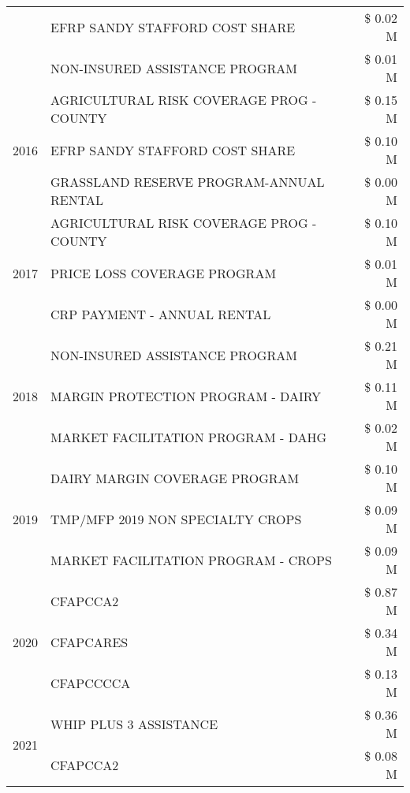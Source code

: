 \begin{tabular}{llr}
 & EFRP SANDY STAFFORD COST SHARE & \$ 0.02 M \\
 & NON-INSURED ASSISTANCE PROGRAM & \$ 0.01 M \\
\cline{1-3}
\multirow[t]{3}{*}{2016} & AGRICULTURAL RISK COVERAGE PROG - COUNTY & \$ 0.15 M \\
 & EFRP SANDY STAFFORD COST SHARE & \$ 0.10 M \\
 & GRASSLAND RESERVE PROGRAM-ANNUAL RENTAL & \$ 0.00 M \\
\cline{1-3}
\multirow[t]{3}{*}{2017} & AGRICULTURAL RISK COVERAGE PROG - COUNTY & \$ 0.10 M \\
 & PRICE LOSS COVERAGE PROGRAM & \$ 0.01 M \\
 & CRP PAYMENT - ANNUAL RENTAL & \$ 0.00 M \\
\cline{1-3}
\multirow[t]{3}{*}{2018} & NON-INSURED ASSISTANCE PROGRAM & \$ 0.21 M \\
 & MARGIN PROTECTION PROGRAM - DAIRY & \$ 0.11 M \\
 & MARKET FACILITATION PROGRAM - DAHG & \$ 0.02 M \\
\cline{1-3}
\multirow[t]{3}{*}{2019} & DAIRY MARGIN COVERAGE PROGRAM & \$ 0.10 M \\
 & TMP/MFP 2019 NON SPECIALTY CROPS & \$ 0.09 M \\
 & MARKET FACILITATION PROGRAM - CROPS & \$ 0.09 M \\
\cline{1-3}
\multirow[t]{3}{*}{2020} & CFAPCCA2 & \$ 0.87 M \\
 & CFAPCARES & \$ 0.34 M \\
 & CFAPCCCCA & \$ 0.13 M \\
\cline{1-3}
\multirow[t]{2}{*}{2021} & WHIP PLUS 3 ASSISTANCE & \$ 0.36 M \\
 & CFAPCCA2 & \$ 0.08 M \\
\cline{1-3}
\bottomrule
\end{tabular}
